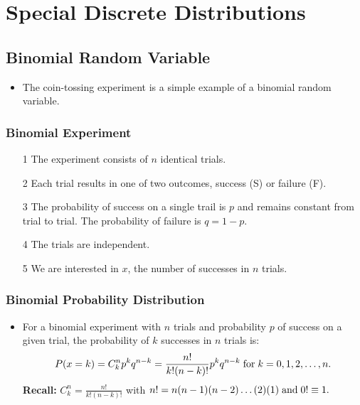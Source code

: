 \documentclass[12pt, letterpaper]{article}
\begin{document}
    \section{Special Discrete Distributions}
        \subsection{Binomial Random Variable}
            \begin{itemize}
                \item The coin-tossing experiment is a simple example of a binomial random variable.
            \end{itemize}
            \subsubsection{Binomial Experiment}
                \begin{itemize}
                    \item[1] The experiment consists of $n$ identical trials.
                    \item[2] Each trial results in one of two outcomes, success (S) or failure (F).
                    \item[3] The probability of success on a single trail is $p$ and remains constant from trial to trial. The probability of failure is $q = 1 - p$.
                    \item[4] The trials are independent.
                    \item[5] We are interested in $x$, the number of successes in $n$ trials.
                \end{itemize}
            \subsubsection{Binomial Probability Distribution}
                \begin{itemize}
                    \item For a binomial experiment with $n$ trials and probability $p$ of success on a given trial, the probability of $k$ successes in $n$ trials is: \smallskip
                        \begin{equation}
                            P(x=k) = C^n_kp^kq^{n-k} = \frac{n!}{k!(n-k)!}p^kq^{n-k} \hspace{1mm} \textnormal{for} \hspace{1mm} k=0,1,2,\dots,n.
                        \end{equation}
                        \textbf{Recall:} $C^n_k = \frac{n!}{k!(n-k)!}$ with $n! = n(n-1)(n-2)\dots(2)(1) \hspace{1mm} \textnormal{and} \hspace{1mm} 0!\equiv 1.$
                \end{itemize}
\end{document}
